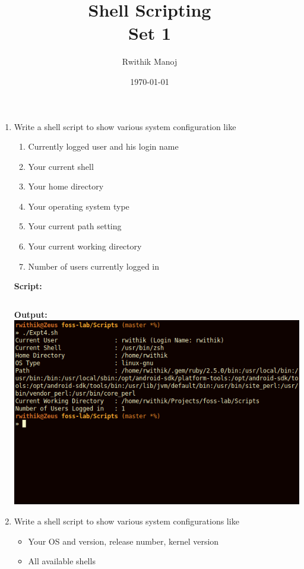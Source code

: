 \documentclass[10pt,a4paper,titlepage]{report}
\begin{document}
\begin{titlepage}
\author{Rwithik Manoj}
\title{Shell Scripting\\Set 1}
\date{\today}
\maketitle
\end{titlepage}
\nonstopmode
\begin{enumerate}
\item Write a shell script to show various system configuration like
\begin{enumerate}
\item Currently logged user and his login name
\item Your current shell
\item Your home directory
\item Your operating system type
\item Your current path setting
\item Your current working directory
\item Number of users currently logged in
\end{enumerate}
\textbf{Script:}\newline
\inputminted{bash}{../Scripts/Expt4.sh}
\textbf{Output:}\newline 
\newline
\includegraphics[width=\linewidth]{../Images/Shell1/1.png}
\pagebreak
\item Write a shell script to show various system configurations like
\begin{itemize}
\item Your OS and version, release number, kernel version
\item All available shells

\end{itemize}
\end{enumerate}
\end{document}
